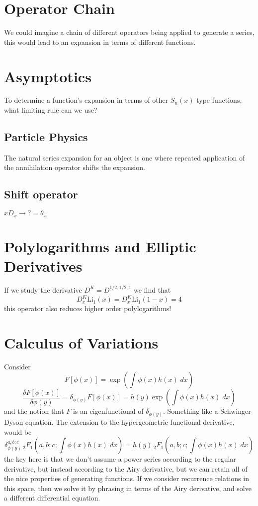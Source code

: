 \documentclass{article}
\begin{document}
\section{Operator Chain}
We could imagine a chain of different operators being applied to generate a series, this would lead to an expansion in terms of different functions.

\section{Asymptotics}
To determine a function's expansion in terms of other $S_n(x)$ type functions, what limiting rule can we use?

\subsection{Particle Physics}
The natural series expansion for an object is one where repeated application of the annihilation operator shifts the expansion.

\subsection{Shift operator}
$x D_x \to ? = \theta_x$

\section{Polylogarithms and Elliptic Derivatives}
If we study the derivative $D^K=D^{1/2,1/2,1}$ we find that 
$$
D_x^K \mathrm{Li}_1(x) = D_x^K \mathrm{Li}_1(1-x) = 4
$$
this operator also reduces higher order polylogarithms!

\section{Calculus of Variations}
Consider 
$$
F[\phi(x)] = \exp\left(\int \phi(x) h(x) \; dx\right)
$$
$$
\frac{\delta F[\phi(x)]}{\delta \phi(y)} = \delta_{\phi(y)}F[\phi(x)] = h(y) \exp\left(\int \phi(x) h(x) \; dx\right)
$$
and the notion that $F$ is an eigenfunctional of $\delta_{\phi(y)}$. Something like a Schwinger-Dyson equation. The extension to the hypergeometric functional derivative, would be 
$$
\delta^{a,b;c}_{\phi(y)} \,_2F_1\left(a,b;c;\int \phi(x) h(x) \; dx\right) = h(y) \,_2F_1\left(a,b;c;\int \phi(x) h(x) \; dx\right)
$$
the key here is that we don't assume a power series according to the regular derivative, but instead according to the Airy derivative, but we can retain all of the nice properties of generating functions. If we consider recurrence relations in this space, then we solve it by phrasing in terms of the Airy derivative, and solve a different differential equation.
\end{document}
